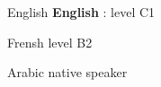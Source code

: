 

\begin{cvskills}

      \cvskill
    {English} %
    {\textbf{English} : level C1} %

      \cvskill
    {Frensh} %
    {level B2} %

      \cvskill
    {Arabic} %
    {native speaker} %
\end{cvskills}

